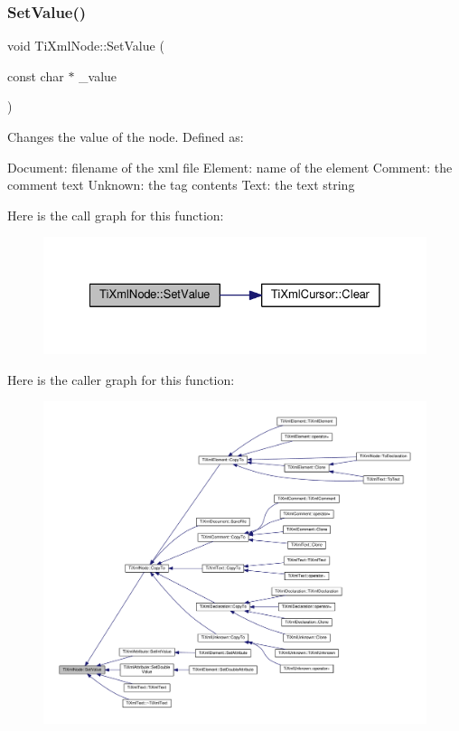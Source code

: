 \subsubsection{\texorpdfstring{Set\+Value()}{SetValue()}}
{\footnotesize\ttfamily void Ti\+Xml\+Node\+::\+Set\+Value (\begin{DoxyParamCaption}\item[{const char $\ast$}]{\+\_\+value }\end{DoxyParamCaption})\hspace{0.3cm}{\ttfamily [inline]}}

Changes the value of the node. Defined as\+: \begin{DoxyVerb}Document:   filename of the xml file
Element:    name of the element
Comment:    the comment text
Unknown:    the tag contents
Text:       the text string
\end{DoxyVerb}
 Here is the call graph for this function\+:\nopagebreak
\begin{figure}[H]
\begin{center}
\leavevmode
\includegraphics[width=328pt]{class_ti_xml_node_a2a38329ca5d3f28f98ce932b8299ae90_cgraph}
\end{center}
\end{figure}
Here is the caller graph for this function\+:\nopagebreak
\begin{figure}[H]
\begin{center}
\leavevmode
\includegraphics[width=350pt]{class_ti_xml_node_a2a38329ca5d3f28f98ce932b8299ae90_icgraph}
\end{center}
\end{figure}
\mbox{\label{class_ti_xml_node_a5ad43b9d545315e9bb4f50d4cb70de9e}} 
